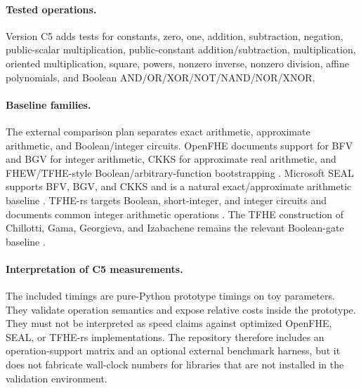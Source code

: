\paragraph{Tested operations.}
Version C5 adds tests for constants, zero, one, addition, subtraction, negation, public-scalar multiplication, public-constant addition/subtraction, multiplication, oriented multiplication, square, powers, nonzero inverse, nonzero division, affine polynomials, and Boolean AND/OR/XOR/NOT/NAND/NOR/XNOR.

\paragraph{Baseline families.}
The external comparison plan separates exact arithmetic, approximate arithmetic, and Boolean/integer circuits.  OpenFHE documents support for BFV and BGV for integer arithmetic, CKKS for approximate real arithmetic, and FHEW/TFHE-style Boolean/arbitrary-function bootstrapping \cite{OpenFHEDocs2026}.  Microsoft SEAL supports BFV, BGV, and CKKS and is a natural exact/approximate arithmetic baseline \cite{MicrosoftSEAL2026}.  TFHE-rs targets Boolean, short-integer, and integer circuits and documents common integer arithmetic operations \cite{ZamaTFHERsDocs2026}.  The TFHE construction of Chillotti, Gama, Georgieva, and Izabachene remains the relevant Boolean-gate baseline \cite{CGGI2020}.

\paragraph{Interpretation of C5 measurements.}
The included timings are pure-Python prototype timings on toy parameters.  They validate operation semantics and expose relative costs inside the prototype.  They must not be interpreted as speed claims against optimized OpenFHE, SEAL, or TFHE-rs implementations.  The repository therefore includes an operation-support matrix and an optional external benchmark harness, but it does not fabricate wall-clock numbers for libraries that are not installed in the validation environment.
